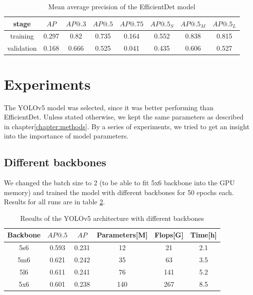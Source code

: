 \begin{table}
    \begin{tabular}{c|c|c|c|c|c|c|c}
        stage      & $AP$  & $AP@.3$ & $AP@.5$ & $AP@.75$ & $AP@.5_S$ & $AP@.5_M$ & $AP@.5_L$ \\ \hline
        training   & 0.297 & 0.82    & 0.735   & 0.164    & 0.552     & 0.838     & 0.815     \\ \hline
        validation & 0.168 & 0.666   & 0.525   & 0.041    & 0.435     & 0.606     & 0.527     \\
    \end{tabular}
    \caption{Mean average precision of the EfficientDet model}
    \label{tab:effdet_basic}
\end{table}


\section{Experiments}
The YOLOv5 model was selected, since it was better performing than EfficientDet. Unless stated otherwise, we kept the same parameters as described in chapter\ref{chapter:methods}. By a series of experiments, we tried to get an insight into the importance of model parameters.
\subsection{Different backbones}
We changed the batch size to 2 (to be able to fit 5x6 backbone into the GPU memory) and trained the model with different backbones for 50 epochs each. Results for all runs are in table \ref{tab:yolov5_backbones}.

\begin{table}
    \begin{tabular}{c|c|c|c|c|c}
        Backbone & $AP@.5$ & $AP$  & Parameters[M] & Flops[G] & Time[h] \\ \hline
        5s6      & 0.593   & 0.231 & 12            & 21       & 2.1     \\ \hline
        5m6      & 0.621   & 0.242 & 35            & 63       & 3.5     \\ \hline
        5l6      & 0.611   & 0.241 & 76            & 141      & 5.2     \\ \hline
        5x6      & 0.601   & 0.238 & 140           & 267      & 8.5     \\
    \end{tabular}
    \caption{Results of the YOLOv5 architecture with different backbones}
    \label{tab:yolov5_backbones}
\end{table}

